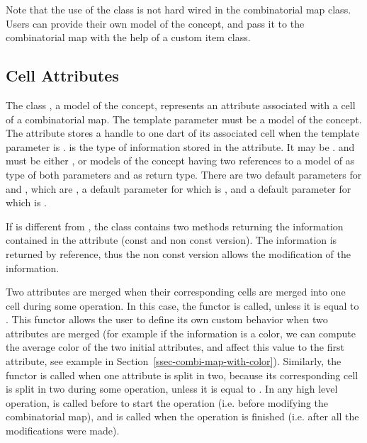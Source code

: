 Note that the use of the  class is not hard wired in
the combinatorial map class. Users can provide their own model of the
 concept, and pass it to the combinatorial map with the help
of a custom item class.

\subsection{Cell Attributes}\label{ssec-attributes}

The class , a
model of the  concept, represents an attribute
associated with a cell of a combinatorial map.  The 
template parameter  must be a model of the
 concept.  The attribute stores a handle to one
dart of its associated cell when the template parameter  is
.
 is the type of information stored in the attribute. It may
be .   and  must be either
, or models of the  concept
having two references to a model of  as type of
both parameters and  as return type.  There are two default
parameters for  and , which are
, a default parameter for  which is
, and a default parameter for  which is
.

If  is different from , the class
 contains two methods  returning the
information contained in the attribute (const and non const version).
The information is returned by reference, thus the non const version
allows the modification of the information.

Two attributes are merged when their corresponding cells are merged
into one cell during some operation. In this case, the functor
 is called, unless it is equal to .
This functor allows the user to define its own custom behavior when
two attributes are merged (for example if the information is a color,
we can compute the average color of the two initial attributes, and
affect this value to the first attribute, see example in
Section~\ref{ssec-combi-map-with-color}).  Similarly, the functor
 is called when one attribute is split in two, because
its corresponding cell is split in two during some operation, unless
it is equal to .  In any high level operation,
 is called before to start the operation (i.e. before
modifying the combinatorial map), and  is called when the
operation is finished (i.e. after all the modifications were made).

